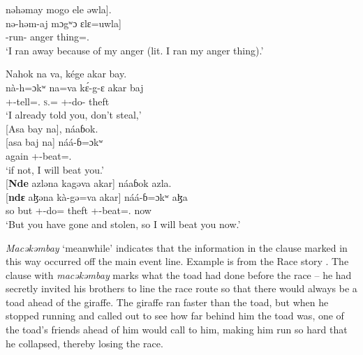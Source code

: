 \medskip
nəhəmay  mogo  ele  əwla].\\
\gll nə-həm-aj mɔgʷɔ ɛlɛ=uwla]\\
     {\oneS}-run-{\CL}  anger thing={\oneS}.{\POSS}\\
\glt  ‘I ran away because of my anger (lit. I ran my anger thing).’ 
\z 

\clearpage
\ea \label{ex:12:60}	
Nahok  na  va,  kége  akar  bay.\\   
\gll  nà-h=ɔkʷ na=va k\'{ɛ}-g-ɛ akar baj  \\    
      {\oneS}+{\PFV}-tell={\twoS}.{\IO}    \textsc{s}.{\DO}={\PRF}  {\twoS}+{\IFV}-do-{\CL}  theft  {\NEG}\\     
\glt ‘I already told you, don’t steal,’\\

\medskip
{}[Asa  bay  na],  náaɓok.\\
\gll {}[asa baj na]  náá-ɓ=ɔkʷ \\ 
     again {\NEG}  {\PSP}  {}{\oneS}+{\POT}{}-beat={\twoS}.{\IO}\\ 
\glt ‘if not, I will beat you.’\\

\medskip
{}[\textbf{Nde} azləna  kagəva  akar]  náaɓok  azla.\\
\gll {}[\textbf{ndɛ} aɮəna kà-gə=va akar] náá-ɓ=ɔkʷ  aɮa\\
     so  but {\twoS}+{\PFV}-do={\PRF}  theft  {\oneS}+{\POT}-beat={\twoS}.{\IO}  now\\
\glt  ‘But you have gone and stolen, so I will beat you now.’  
\z 

\largerpage
\textit{Macəkəmbay} ‘meanwhile’ indicates that the information in the clause marked in this way occurred off the main event line. Example  is from the Race story \citep{Friesen2003}. The clause with \textit{macəkəmbay} marks what the toad had done before the race -- he had secretly invited his brothers to line the race route so that there would always be a toad ahead of the giraffe. The giraffe ran faster than the toad, but when he stopped running and called out to see how far behind him the toad was, one of the toad’s friends ahead of him would call to him, making him run so hard that he collapsed, thereby losing the race. 

